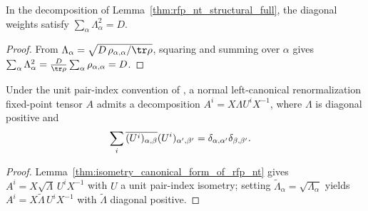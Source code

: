 \begin{lemma}%
    \label{thm:rfp_nt_structural_full_sq_sum}
    \leanok
    In the decomposition of Lemma~\ref{thm:rfp_nt_structural_full}, the
    diagonal weights satisfy $\sum_\alpha \Lambda_\alpha^2 = D$.
\end{lemma}
\begin{proof}\leanok
    From $\Lambda_\alpha = \sqrt{D\,\rho_{\alpha,\alpha}/\tr\rho}$, squaring
    and summing over $\alpha$ gives
    $\sum_\alpha \Lambda_\alpha^2 = \frac{D}{\tr\rho}\sum_\alpha \rho_{\alpha,\alpha} = D$.
\end{proof}

\begin{lemma}%
    \label{thm:rfp_nt_structural_full_unit_pair}
    \leanok
    Under the unit pair-index convention of
    \cite[Section~3]{Cirac2016MPDO_arXiv}, a normal left-canonical
    renormalization fixed-point tensor $A$ admits a decomposition
    $A^i=X\Lambda U^iX^{-1}$, where $\Lambda$ is diagonal positive and
    \begin{align}
        \sum_i \overline{(U^i)_{\alpha,\beta}}
        (U^i)_{\alpha',\beta'}
         & =
        \delta_{\alpha,\alpha'}\delta_{\beta,\beta'}.
        \notag
    \end{align}
\end{lemma}
\begin{proof}\leanok
    Lemma~\ref{thm:isometry_canonical_form_of_rfp_nt} gives
    $A^i = X\sqrt{\Lambda}\,U^i X^{-1}$ with $U$ a unit pair-index isometry;
    setting $\widetilde\Lambda_\alpha = \sqrt{\Lambda_\alpha}$ yields
    $A^i = X\widetilde\Lambda\,U^i X^{-1}$ with $\widetilde\Lambda$ diagonal
    positive.
\end{proof}


